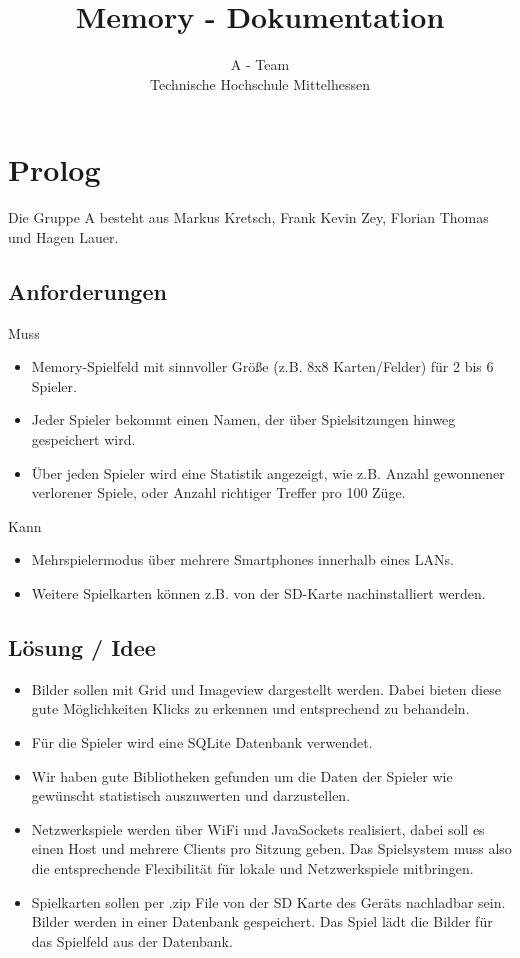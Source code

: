\documentclass[11pt,a4paper]{article}
\begin{document}
\title{Memory - Dokumentation}
\author{A - Team\\Technische Hochschule Mittelhessen}
\renewcommand{\today}{26. Juli 2012}
\maketitle

\tableofcontents

\section {Prolog}
Die Gruppe A besteht aus Markus Kretsch, Frank Kevin Zey, Florian Thomas und Hagen Lauer.

\subsection{Anforderungen}

Muss
\begin{itemize}
\item Memory-Spielfeld mit sinnvoller Größe (z.B. 8x8 Karten/Felder) für 2 bis 6 Spieler.
\item Jeder Spieler bekommt einen Namen, der über Spielsitzungen hinweg gespeichert wird.
\item Über jeden Spieler wird eine Statistik angezeigt, wie z.B. Anzahl gewonnener \/ verlorener Spiele, oder Anzahl richtiger Treffer pro 100 Züge.
\end{itemize}
Kann
\begin{itemize}
\item Mehrspielermodus über mehrere Smartphones innerhalb eines LANs.
\item Weitere Spielkarten können z.B. von der SD-Karte nachinstalliert werden.
\end{itemize}
\subsection{Lösung / Idee}

\begin{itemize}

\item Bilder sollen mit Grid und Imageview dargestellt werden. Dabei bieten diese gute Möglichkeiten Klicks zu erkennen und entsprechend zu behandeln.
\item Für die Spieler wird eine SQLite Datenbank verwendet.
\item Wir haben gute Bibliotheken gefunden um die Daten der Spieler wie gewünscht statistisch auszuwerten und darzustellen.
\item Netzwerkspiele werden über WiFi und JavaSockets realisiert, dabei soll es einen Host und mehrere Clients pro Sitzung geben. Das Spielsystem muss also die entsprechende Flexibilität für lokale und Netzwerkspiele mitbringen.
\item Spielkarten sollen per .zip File von der SD Karte des Geräts nachladbar sein. Bilder werden in einer Datenbank gespeichert. Das Spiel lädt die Bilder für das Spielfeld aus der Datenbank.
\end{itemize}
\end{document}
